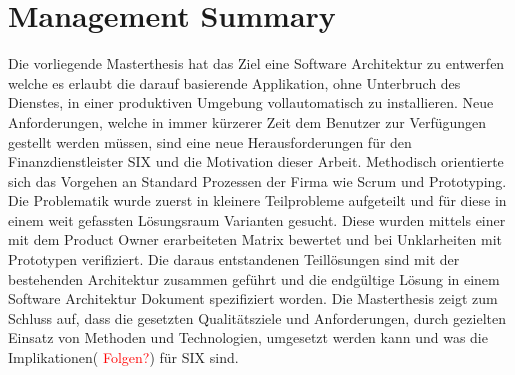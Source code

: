 \chapter{Management Summary}

Die vorliegende Masterthesis hat das Ziel eine Software Architektur zu entwerfen welche es erlaubt die darauf basierende Applikation, ohne Unterbruch des Dienstes, in einer produktiven Umgebung vollautomatisch zu installieren.\newline\newline
Neue Anforderungen, welche in immer kürzerer Zeit dem Benutzer zur Verfügungen gestellt werden müssen, sind eine neue Herausforderungen für den Finanzdienstleister SIX und die Motivation dieser Arbeit.\newline\newline
Methodisch orientierte sich das Vorgehen an Standard Prozessen der Firma wie Scrum und Prototyping. Die Problematik wurde zuerst in kleinere Teilprobleme aufgeteilt und für diese in einem weit gefassten Lösungsraum Varianten gesucht. Diese wurden mittels einer mit dem Product Owner erarbeiteten Matrix bewertet und bei Unklarheiten mit Prototypen verifiziert. Die daraus entstandenen Teillösungen sind mit der bestehenden Architektur zusammen geführt und die endgültige Lösung in einem Software Architektur Dokument spezifiziert worden.\newline\newline
Die Masterthesis zeigt zum Schluss auf, dass die gesetzten Qualitätsziele und Anforderungen, durch gezielten Einsatz von Methoden und Technologien, umgesetzt werden kann und was die Implikationen(\textcolor{red}{ Folgen?}) für SIX sind.